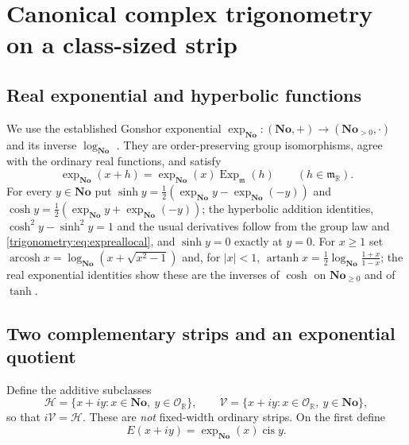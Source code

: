 \documentclass[11pt,letterpaper]{article}
\numberwithin{equation}{section}
\theoremstyle{definition}
\theoremstyle{remark}
\newcommand{\No}{\mathbf{No}}
\newcommand{\R}{\mathbb R}
\newcommand{\OO}{\mathcal O}
\newcommand{\mm}{\mathfrak m}
\newcommand{\cis}{\operatorname{cis}}
\newcommand{\arcosh}{\operatorname{arcosh}}
\newcommand{\artanh}{\operatorname{artanh}}
\newcommand{\Ex}{\operatorname{Exp}_{\mm}}
\begin{document}
\section{Canonical complex trigonometry on a class-sized strip}\label{trigonometry:sec:strip}

\subsection{Real exponential and hyperbolic functions}
We use the established Gonshor exponential
$\exp_{\No}:(\No,+)\to(\No_{>0},\cdot)$ and its inverse $\log_{\No}$ \cite{Gonshor,vdDE}. They are
order-preserving group isomorphisms, agree with the ordinary real functions, and satisfy
\begin{equation}\label{trigonometry:eq:expreallocal}
 \exp_{\No}(x+h)=\exp_{\No}(x)\Ex(h)\qquad(h\in\mm_{\R}).
\end{equation}
For every $y\in\No$ put
$\sinh y=\frac12(\exp_{\No}y-\exp_{\No}(-y))$ and $\cosh y=\frac12(\exp_{\No}y+\exp_{\No}(-y))$;
the hyperbolic addition identities, $\cosh^2y-\sinh^2y=1$ and the usual derivatives follow from
the group law and \cref{trigonometry:eq:expreallocal}, and $\sinh y=0$ exactly at $y=0$. For
$x\ge1$ set $\arcosh x=\log_{\No}(x+\sqrt{x^2-1})$ and, for $|x|<1$,
$\artanh x=\frac12\log_{\No}\frac{1+x}{1-x}$; the real exponential identities show these are the
inverses of $\cosh$ on $\No_{\ge0}$ and of $\tanh$.

\subsection{Two complementary strips and an exponential quotient}
Define the additive subclasses
\[
 \mathscr H=\{x+iy:x\in\No,\ y\in\OO_{\R}\},\qquad
 \mathscr V=\{x+iy:x\in\OO_{\R},\ y\in\No\},
\]
so that $i\mathscr V=\mathscr H$. These are \emph{not} fixed-width ordinary strips. On the first
define
\begin{equation}\label{trigonometry:eq:stripexp}
 E(x+iy)=\exp_{\No}(x)\cis y .
\end{equation}
\end{document}
